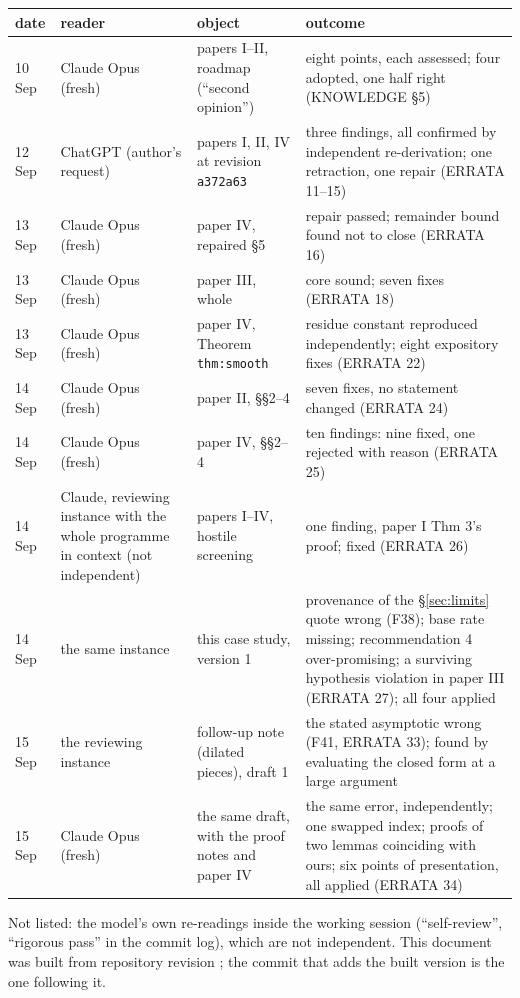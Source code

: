 \documentclass[11pt,a4paper]{article}
\begin{document}
\begin{center}\small
\begin{tabular}{@{}p{1.2cm}p{2.9cm}p{5.2cm}p{4.6cm}@{}}
\toprule
date & reader & object & outcome\\
\midrule
10 Sep & Claude Opus (fresh) & papers I--II, roadmap (``second opinion'') & eight points, each assessed; four adopted, one
half right (KNOWLEDGE \S5)\\
12 Sep & ChatGPT (author's request) & papers I, II, IV at revision \texttt{a372a63} & three findings, all confirmed by
independent re-derivation; one retraction, one repair (ERRATA 11--15)\\
13 Sep & Claude Opus (fresh) & paper IV, repaired \S5 & repair passed; remainder bound found not to close (ERRATA 16)\\
13 Sep & Claude Opus (fresh) & paper III, whole & core sound; seven fixes (ERRATA 18)\\
13 Sep & Claude Opus (fresh) & paper IV, Theorem \texttt{thm:smooth} & residue constant reproduced independently; eight
expository fixes (ERRATA 22)\\
14 Sep & Claude Opus (fresh) & paper II, \S\S2--4 & seven fixes, no statement changed (ERRATA 24)\\
14 Sep & Claude Opus (fresh) & paper IV, \S\S2--4 & ten findings: nine fixed, one rejected with reason (ERRATA 25)\\
14 Sep & Claude, reviewing instance with the whole programme in context (not independent) & papers I--IV, hostile
screening & one finding, paper I Thm 3's proof; fixed (ERRATA 26)\\
14 Sep & the same instance & this case study, version 1 & provenance of the \S\ref{sec:limits} quote wrong (F38); base
rate missing; recommendation 4 over-promising; a surviving hypothesis violation in paper III (ERRATA 27); all four
applied\\
15 Sep & the reviewing instance & follow-up note (dilated pieces), draft 1 & the stated asymptotic wrong (F41, ERRATA 33);
found by evaluating the closed form at a large argument\\
15 Sep & Claude Opus (fresh) & the same draft, with the proof notes and paper IV & the same error, independently; one swapped index; proofs
of two lemmas coinciding with ours; six points of presentation, all applied (ERRATA 34)\\
\bottomrule
\end{tabular}
\end{center}
\noindent Not listed: the model's own re-readings inside the working session (``self-review'', ``rigorous pass'' in the
commit log), which are not independent. This document was built from repository revision \texttt{\RepoRev}; the
commit that adds the built version is the one following it.
\end{document}
